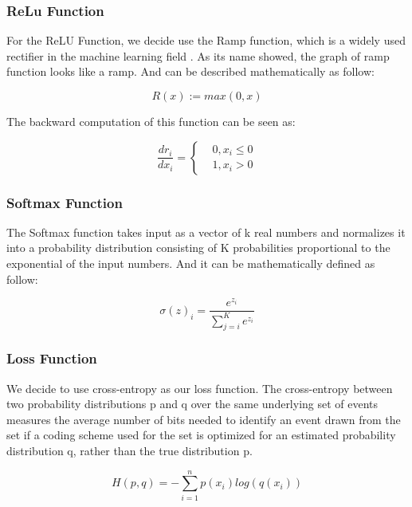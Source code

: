 \documentclass[twoside,twocolumn]{article}
\begin{document}
\subsubsection{ReLu Function}

For the ReLU Function, we decide use the Ramp function, which is a widely used rectifier
in the machine learning field \cite{relu}. As its name showed, the graph of ramp function looks like a ramp. And can be described mathematically as follow:

\begin{equation}
	R(x):=max(0,x)
\end{equation}

The backward computation of this function can be seen as:

\begin{equation}
	\frac{dr_i}{dx_i}=\left\{
	\begin{aligned}
		&0, x_i\leq 0\\
		&1, x_i> 0
	\end{aligned}
	\right.
\end{equation}

\subsubsection{Softmax Function}

The Softmax function \cite{softmax} takes input as a vector of k real numbers and normalizes it into a probability distribution consisting of K probabilities proportional to the exponential of the input numbers. And it can be mathematically defined as follow:

\begin{equation}
	\sigma(z)_i = \frac{e^{z_i}}{\sum_{j=i}^K e^{z_i}}
\end{equation}

\subsubsection{Loss Function}

We decide to use cross-entropy as our loss function. The cross-entropy \cite{cross} between two probability distributions p and q over the same underlying set of events measures the average number of bits needed to identify an event drawn from the set if a coding scheme used for the set is optimized for an estimated probability distribution q, rather than the true distribution p.

\begin{equation*}
	H(p,q) = -\sum_{i=1}^n p(x_i)log(q(x_i))
\end{equation*}
\end{document}
